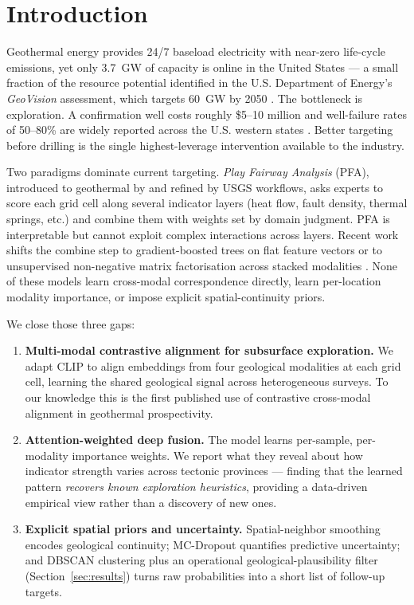 \documentclass[review,12pt]{elsarticle}
\begin{document}
\linenumbers

\section{Introduction}
\label{sec:intro}

Geothermal energy provides 24/7 baseload electricity with near-zero life-cycle emissions, yet only \SI{3.7}{\giga\watt} of capacity is online in the United States — a small fraction of the resource potential identified in the U.S. Department of Energy's \emph{GeoVision} assessment, which targets \SI{60}{\giga\watt} by 2050 \citep{DOE2019}. The bottleneck is exploration. A confirmation well costs roughly \$5--10 million and well-failure rates of 50--80\% are widely reported across the U.S. western states \citep{Williams2008,Faulds2020}. Better targeting before drilling is the single highest-leverage intervention available to the industry.

Two paradigms dominate current targeting. \emph{Play Fairway Analysis} (PFA), introduced to geothermal by \citet{Faulds2020} and refined by USGS workflows, asks experts to score each grid cell along several indicator layers (heat flow, fault density, thermal springs, etc.) and combine them with weights set by domain judgment. PFA is interpretable but cannot exploit complex interactions across layers. Recent work shifts the combine step to gradient-boosted trees on flat feature vectors \citep{Mordensky2025} or to unsupervised non-negative matrix factorisation across stacked modalities \citep{Vesselinov2022}. None of these models learn cross-modal correspondence directly, learn per-location modality importance, or impose explicit spatial-continuity priors.

We close those three gaps:

\begin{enumerate}
  \item \textbf{Multi-modal contrastive alignment for subsurface exploration.} We adapt CLIP \citep{Radford2021} to align embeddings from four geological modalities at each grid cell, learning the shared geological signal across heterogeneous surveys. To our knowledge this is the first published use of contrastive cross-modal alignment in geothermal prospectivity.
  \item \textbf{Attention-weighted deep fusion.} The model learns per-sample, per-modality importance weights. We report what they reveal about how indicator strength varies across tectonic provinces — finding that the learned pattern \emph{recovers known exploration heuristics}, providing a data-driven empirical view rather than a discovery of new ones.
  \item \textbf{Explicit spatial priors and uncertainty.} Spatial-neighbor smoothing encodes geological continuity; MC-Dropout quantifies predictive uncertainty; and DBSCAN clustering plus an operational geological-plausibility filter (Section~\ref{sec:results}) turns raw probabilities into a short list of follow-up targets.
\end{enumerate}
\end{document}
